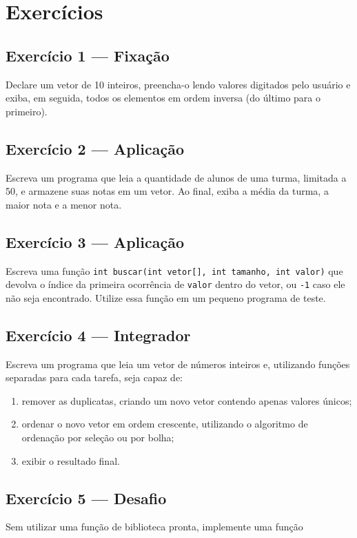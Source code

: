 \section*{Exercícios}

\begin{exercicio}

\subsection*{Exercício 1 --- Fixação}
Declare um vetor de 10 inteiros, preencha-o lendo valores digitados pelo usuário e exiba, em seguida, todos os elementos em ordem inversa (do último para o primeiro).

\subsection*{Exercício 2 --- Aplicação}
Escreva um programa que leia a quantidade de alunos de uma turma, limitada a 50, e armazene suas notas em um vetor. Ao final, exiba a média da turma, a maior nota e a menor nota.

\subsection*{Exercício 3 --- Aplicação}
Escreva uma função \texttt{int buscar(int vetor[], int tamanho, int valor)} que devolva o índice da primeira ocorrência de \texttt{valor} dentro do vetor, ou \texttt{-1} caso ele não seja encontrado. Utilize essa função em um pequeno programa de teste.

\subsection*{Exercício 4 --- Integrador}
Escreva um programa que leia um vetor de números inteiros e, utilizando funções separadas para cada tarefa, seja capaz de:

\begin{enumerate}
\item remover as duplicatas, criando um novo vetor contendo apenas valores únicos;
\item ordenar o novo vetor em ordem crescente, utilizando o algoritmo de ordenação por seleção ou por bolha;
\item exibir o resultado final.
\end{enumerate}

\subsection*{Exercício 5 --- Desafio}
Sem utilizar uma função de biblioteca pronta, implemente uma função


\end{exercicio}
